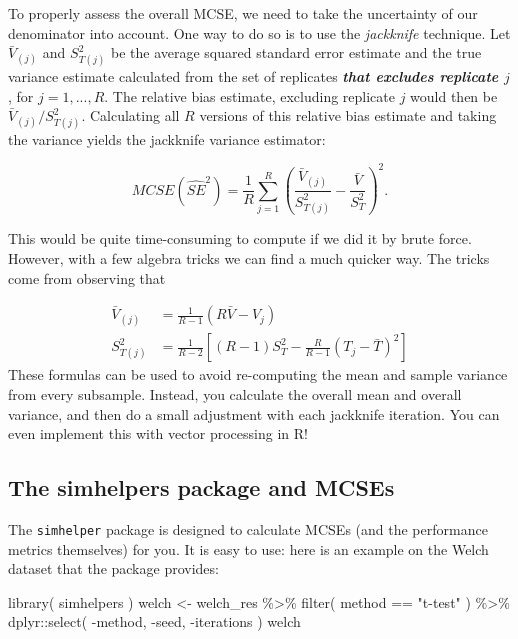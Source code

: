 \documentclass[
]{book}
\newenvironment{Shaded}{\begin{snugshade}}{\end{snugshade}}
\newcommand{\FunctionTok}[1]{\textcolor[rgb]{0.00,0.00,0.00}{#1}}
\newcommand{\NormalTok}[1]{#1}
\newcommand{\OtherTok}[1]{\textcolor[rgb]{0.56,0.35,0.01}{#1}}
\newcommand{\SpecialCharTok}[1]{\textcolor[rgb]{0.00,0.00,0.00}{#1}}
\newcommand{\StringTok}[1]{\textcolor[rgb]{0.31,0.60,0.02}{#1}}
\begin{document}
To properly assess the overall MCSE, we need to take the uncertainty of our denominator into account. One way to do so is to use the \emph{jackknife} technique.
Let \(\bar{V}_{(j)}\) and \(S_{T(j)}^2\) be the average squared standard error estimate and the true variance estimate calculated from the set of replicates \textbf{\emph{that excludes replicate \(j\)}}, for \(j = 1,...,R\).
The relative bias estimate, excluding replicate \(j\) would then be \(\bar{V}_{(j)} / S_{T(j)}^2\).
Calculating all \(R\) versions of this relative bias estimate and taking the variance yields the jackknife variance estimator:

\[
MCSE\left(\widehat{SE}^2\right) = \frac{1}{R} \sum_{j=1}^R \left(\frac{\bar{V}_{(j)}}{S_{T(j)}^2} - \frac{\bar{V}}{S_T^2}\right)^2.
\]

This would be quite time-consuming to compute if we did it by brute force. However, with a few algebra tricks we can find a much quicker way. The tricks come from observing that

\[
\begin{aligned}
\bar{V}_{(j)} &= \frac{1}{R - 1}\left(R \bar{V} - V_j\right) \\
S_{T(j)}^2 &= \frac{1}{R - 2} \left[(R - 1) S_T^2 - \frac{R}{R - 1}\left(T_j - \bar{T}\right)^2\right]
\end{aligned}
\]
These formulas can be used to avoid re-computing the mean and sample variance from every subsample.
Instead, you calculate the overall mean and overall variance, and then do a small adjustment with each jackknife iteration.
You can even implement this with vector processing in R!

\hypertarget{the-simhelpers-package-and-mcses}{%
\subsection{The simhelpers package and MCSEs}\label{the-simhelpers-package-and-mcses}}

The \texttt{simhelper} package is designed to calculate MCSEs (and the performance metrics themselves) for you.
It is easy to use: here is an example on the Welch dataset that the package provides:

\begin{Shaded}
\begin{Highlighting}[]
\FunctionTok{library}\NormalTok{( simhelpers )}
\NormalTok{welch }\OtherTok{\textless{}{-}}\NormalTok{ welch\_res }\SpecialCharTok{\%\textgreater{}\%}
  \FunctionTok{filter}\NormalTok{( method }\SpecialCharTok{==} \StringTok{"t{-}test"}\NormalTok{ ) }\SpecialCharTok{\%\textgreater{}\%}
\NormalTok{  dplyr}\SpecialCharTok{::}\FunctionTok{select}\NormalTok{( }\SpecialCharTok{{-}}\NormalTok{method, }\SpecialCharTok{{-}}\NormalTok{seed, }\SpecialCharTok{{-}}\NormalTok{iterations )}
\NormalTok{welch}
\end{Highlighting}
\end{Shaded}
\end{document}
